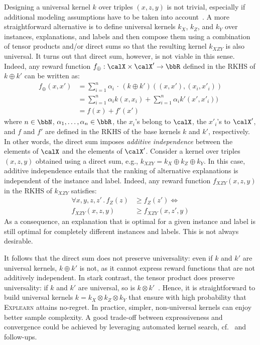 \documentclass[letterpaper]{article} %
\newcommand{\explearn}{\textsc{Explearn}\xspace}
\begin{document}
Designing a universal kernel $k$ over triples $(x, z, y)$ is not trivial, especially if additional modeling assumptions have to be taken into account~\cite{gretton2015simpler}.  A more straightforward alternative is to define universal kernels $k_X$, $k_Z$, and $k_Y$ over instances, explanations, and labels and then compose them using a combination of tensor products and/or direct sums so that the resulting kernel $k_{XZY}$ is also universal.  It turns out that direct sum, however, is not viable in this sense.  Indeed, any reward function $f_\oplus: \calX \times \calX' \to \bbR$ defined in the RKHS of $k \oplus k'$ can be written as:
%
\begin{align*}
    f_\oplus(x, x')
        & \textstyle = \sum_{i=1}^n \alpha_i \,\cdot\, (k \oplus k')((x,x'), (x_i, x'_i))
    \\
        & \textstyle = \sum_{i=1}^n \alpha_i k(x, x_i) + \sum_{i=1}^n \alpha_i k'(x', x'_i))
    \\
        & \textstyle = f(x) + f'(x')
\end{align*}
%
where $n \in \bbN$, $\alpha_1, \ldots, \alpha_n \in \bbR$, the $x_i$'s belong to $\calX$, the $x'_i$'s to $\calX'$, and $f$ and $f'$ are defined in the RKHS of the base kernels $k$ and $k'$, respectively.  In other words, the direct sum imposes \emph{additive independence} between the elements of $\calX$ and the elements of $\calX'$.  Consider a kernel over triples $(x, z, y)$ obtained using a direct sum, e.g., $k_{XZY} = k_X \oplus k_Z \oplus k_Y$.  In this case, additive independence entails that the ranking of alternative explanations is independent of the instance and label.  Indeed, any reward function $f_{XZY}(x,z,y)$ in the RKHS of $k_{XZY}$ satisfies:
%
\begin{align*}
    \forall x, y, z, z' \,.\, f_Z(z)
        & \ge f_Z(z') \iff
    \\
    f_{XZY}(x,z,y)
        & \ge f_{XZY}(x,z',y)
\end{align*}
%
As a consequence, an explanation that is optimal for a given instance and label is still optimal for completely different instances and labels.  This is not always desirable.

It follows that the direct sum does not preserve universality: even if $k$ and $k'$ are universal kernels, $k \oplus k'$ is not, as it cannot express reward functions that are not additively independent.  In stark contrast, the tensor product does preserve universality:  if $k$ and $k'$ are universal, so is $k \otimes k'$~\cite{blanchard2011generalizing,gretton2015simpler,szabo2017characteristic}.  Hence, it is straightforward to build universal kernels $k = k_X \otimes k_Z \otimes k_Y$ that ensure with high probability that \explearn attains no-regret.  In practice, simpler, non-universal kernels can enjoy better sample complexity.  A good trade-off between expressiveness and convergence could be achieved by leveraging automated kernel search, cf.~\cite{grosse2012exploiting} and follow-ups.
\end{document}
